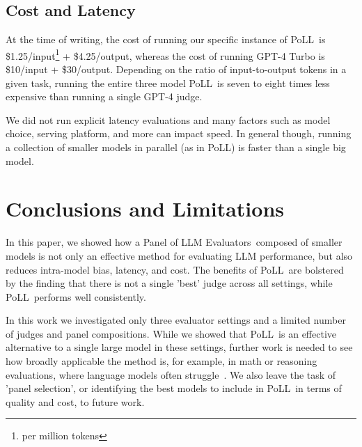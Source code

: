 \documentclass[11pt]{article}
\newcommand{\pat}[1]{\textcolor{blue}{\textbf{TODO(pat):} #1}}
\newcommand{\methodcaps}{Panel of LLM Evaluators\ }
\newcommand{\acronymnospace}{PoLL}
\newcommand{\acronym}{PoLL\ }
\begin{document}
\subsection{Cost and Latency}
At the time of writing, the cost of running our specific instance of \acronym is \$1.25/input\footnote{per million tokens} + \$4.25/output, whereas the cost of running GPT-4 Turbo is \$10/input + \$30/output. Depending on the ratio of input-to-output tokens in a given task, running the entire three model \acronym is seven to eight times less expensive than running a single GPT-4 judge. 

We did not run explicit latency evaluations and many factors such as model choice, serving platform, and more can impact speed. In general though, running a collection of smaller models in parallel (as in \acronymnospace) is faster than a single big model.  






\section{Conclusions and Limitations}
In this paper, we showed how a \methodcaps composed of smaller models is not only an effective method for evaluating LLM performance, but also reduces intra-model bias, latency, and cost. The benefits of \acronym are bolstered by the finding that there is not a single 'best' judge across all settings, while \acronym performs well consistently.

In this work we investigated only three evaluator settings and a limited number of judges and panel compositions. While we showed that \acronym is an effective alternative to a single large model in these settings, further work is needed to see how broadly applicable the method is, for example, in math or reasoning evaluations, where language models often struggle~\cite{zheng2024judging}. We also leave the task of 'panel selection', or identifying the best models to include in \acronym in terms of quality and cost, to future work.
\end{document}
